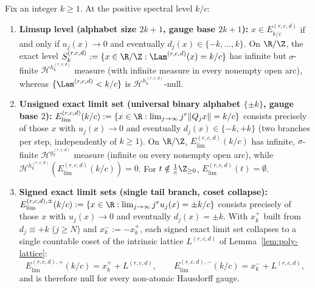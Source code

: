 \begin{theorem}\label{thm:poly-gauge-trichotomy}
Fix an integer $k\ge1$. At the positive spectral level $k/c$:
\begin{enumerate}[label=(\roman*),leftmargin=2em]
\item \textbf{Limsup level (alphabet size $2k+1$, gauge base $2k+1$):}
$x\in E_{k/c}^{(r,c,d)}$ if and only if $u_j(x)\to0$ and eventually
$d_j(x)\in\{-k,\dots,k\}$. On $\R/\Z$, the exact level
$S_k^{(r,c,d)}:=\{x\in\R/\Z:\Lam^{(r,c,d)}(x)=k/c\}$ has infinite but
$\sigma$-finite $\mathcal H^{h_k^{(r,c,d)}}$ measure (with infinite measure in
every nonempty open arc), whereas $\{\Lam^{(r,c,d)}<k/c\}$ is
$\mathcal H^{h_k^{(r,c,d)}}$-null.
\item \textbf{Unsigned exact limit set (universal binary alphabet $\{\pm k\}$, gauge base $2$):}
$E_{\mathrm{lim}}^{(r,c,d)}(k/c):=\{x\in\R:\lim_{j\to\infty}j^r\|Q_jx\|=k/c\}$
consists precisely of those $x$ with $u_j(x)\to0$ and eventually
$d_j(x)\in\{-k,+k\}$ (two branches per step, independently of $k\ge1$). On
$\R/\Z$, $E_{\mathrm{lim}}^{(r,c,d)}(k/c)$ has infinite, $\sigma$-finite
$\mathcal H^{g_2^{(r,c,d)}}$ measure (infinite on every nonempty open arc),
while $\mathcal H^{h_k^{(r,c,d)}}(E_{\mathrm{lim}}^{(r,c,d)}(k/c))=0$. For
$t\notin\frac1c\Z_{\ge0}$, $E_{\mathrm{lim}}^{(r,c,d)}(t)=\emptyset$.
\item \textbf{Signed exact limit sets (single tail branch, coset collapse):}
$E_{\mathrm{lim}}^{(r,c,d),\pm}(k/c):=\{x\in\R:\lim_{j\to\infty}j^ru_j(x)=\pm k/c\}$
consists precisely of those $x$ with $u_j(x)\to0$ and eventually $d_j(x)=\pm k$.
With $x_k^+$ built from $d_j\equiv+k$ ($j\ge N$) and $x_k^-:=-x_k^+$, each signed
exact limit set collapses to a single countable coset of the intrinsic lattice
$L^{(r,c,d)}$ of Lemma~\ref{lem:poly-lattice}:
\[
E_{\mathrm{lim}}^{(r,c,d),+}(k/c)=x_k^+ + L^{(r,c,d)},\qquad
E_{\mathrm{lim}}^{(r,c,d),-}(k/c)=x_k^- + L^{(r,c,d)},
\]
and is therefore null for every non-atomic Hausdorff gauge.
\end{enumerate}
\end{theorem}

